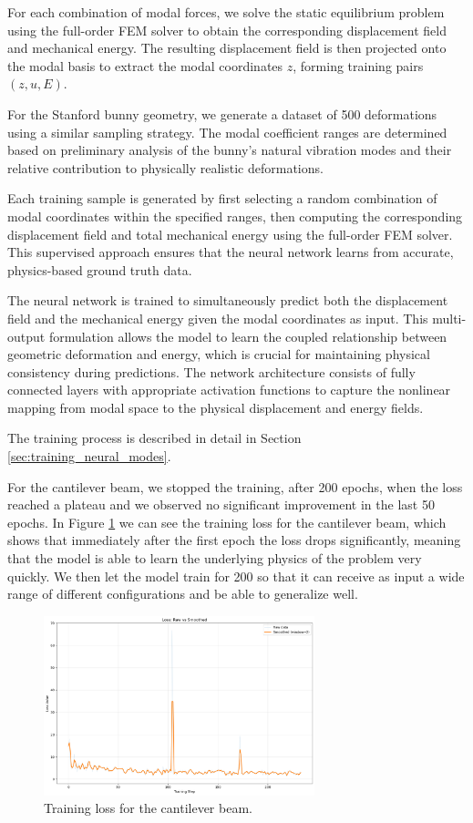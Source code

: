 For each combination of modal forces, we solve the static equilibrium problem using the full-order FEM solver to obtain the corresponding displacement field and mechanical energy. The resulting displacement field is then projected onto the modal basis to extract the modal coordinates $z$, forming training pairs $(z, u, E)$.

For the Stanford bunny geometry, we generate a dataset of 500 deformations using a similar sampling strategy. The modal coefficient ranges are determined based on preliminary analysis of the bunny's natural vibration modes and their relative contribution to physically realistic deformations.

Each training sample is generated by first selecting a random combination of modal coordinates within the specified ranges, then computing the corresponding displacement field and total mechanical energy using the full-order FEM solver. This supervised approach ensures that the neural network learns from accurate, physics-based ground truth data.

The neural network is trained to simultaneously predict both the displacement field and the mechanical energy given the modal coordinates as input. This multi-output formulation allows the model to learn the coupled relationship between geometric deformation and energy, which is crucial for maintaining physical consistency during predictions. The network architecture consists of fully connected layers with appropriate activation functions to capture the nonlinear mapping from modal space to the physical displacement and energy fields.

The training process is described in detail in Section \ref{sec:training_neural_modes}.

For the cantilever beam, we stopped the training, after 200 epochs, when the loss reached a plateau and we observed no significant improvement in the last 50 epochs. In Figure \ref{fig:training_loss_beam} we can see the training loss for the cantilever beam, which shows that immediately after the first epoch the loss drops significantly, meaning that the model is able to learn the underlying physics of the problem very quickly. We then let the model train for 200 so that it can receive as input a wide range of different configurations and be able to generalize well.

\begin{figure}[H]
    \centering
    \includegraphics[width=0.7\textwidth]{Images/training_loss_smoothed.png}
    \caption{Training loss for the cantilever beam.}
    \label{fig:training_loss_beam}
\end{figure}

